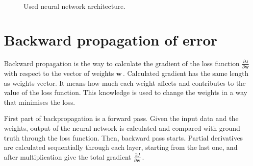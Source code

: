 \begin{figure}[!h]
  \centering
  
  
  
  \caption{Used neural network architecture.}
  \label{fig:architecture}
\end{figure}




\section{Backward propagation of error}
\label{backprop}

Backward propagation is the way to calculate the gradient of the loss function $\frac{\partial J}{\partial \textbf{w}}$ with respect to the vector of weights $\textbf{w}$\,. Calculated gradient has the same length as weights vector. It means how much each weight affects and contributes to the value of the loss function. This knowledge is used to change the weights in a way that minimises the loss. 

First part of backpropagation is a forward pass. Given the input data and the weights, output of the neural network is calculated and compared with ground truth through the loss function. Then, backward pass starts. Partial derivatives are calculated sequentially through each layer, starting from the last one, and after multiplication give the total gradient $\frac{\partial J}{\partial \textbf{w}}$\,.

